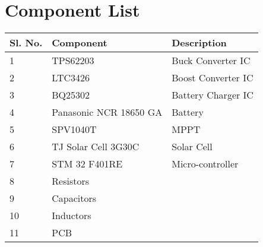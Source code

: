 \chapter{Component List}
\begin{table}[h]
	\begin{center}
	\begin{tabular}{|l|l|l|}
		\hline
		{\bf Sl. No.} & {\bf Component} & {\bf Description} \\ \hline
1 & TPS62203 & Buck Converter IC \\ \hline
2 & LTC3426 & Boost Converter IC \\ \hline
3 & BQ25302 & Battery Charger IC \\ \hline
4 & Panasonic NCR 18650 GA & Battery \\ \hline
5 & SPV1040T & MPPT \\ \hline
6 & TJ Solar Cell 3G30C & Solar Cell \\ \hline
7 & STM 32 F401RE & Micro-controller \\ \hline
8 & Resistors &  \\ \hline
9 & Capacitors &  \\ \hline
10 & Inductors &  \\ \hline
11 & PCB &  \\ \hline
	\end{tabular}
	\end{center}
\end{table}
